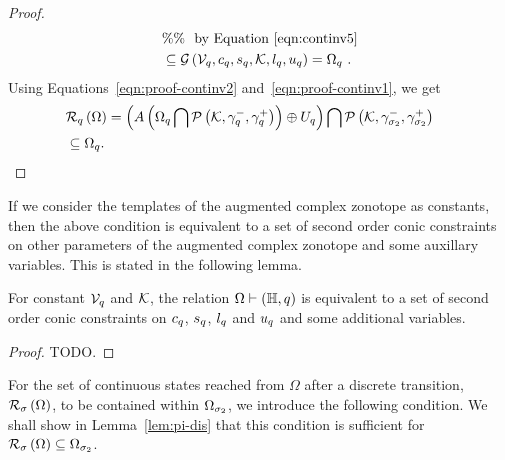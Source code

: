 \begin{proof}
\begin{align}
& \%\%~~\text{by Equation~\ref{eqn:continv5}}\nonumber\\
& \subseteq \mathcal{G}\left(\mathcal{V}_q,c_q,s_q,\mathcal{K},l_q,u_q\right)=\Omega_q~\label{eqn:proof-continv2}.
\end{align}
%
Using Equations~\ref{eqn:proof-continv2} and~\ref{eqn:proof-continv1},
we get
\begin{align*}
& \contreach{\loc}{\Omega}=\lt(\minsum{A\lt(\Omega_q\bigcap{\ptope{\qtemp}{\lsys{\stay_\loc}}{\usys{\stay_\loc}}}\rt)}{\inputset_\loc}\rt)\bigcap
\ptope{\qtemp}{\lsys{\stay_{\edge_2}}}{\usys{\stay_{\edge_2}}}\\
& \subseteq \Omega_\loc.\hspace{25em}\qedhere
\end{align*}
%
\end{proof}
%
If we consider the templates of the augmented complex zonotope as
constants, then the above condition is equivalent to a set of second
order conic constraints on other parameters of the augmented complex
zonotope and some auxillary variables.  This is stated in the
following lemma.
%
\begin{lemma}
For constant $\mathcal{V}_{q}$ and $\mathcal{K}$, the relation
$\Omega\vdash\left(\mathbb{H},q\right)$ is equivalent to a set of second order conic
constraints on $c_q$, $s_q$, $l_q$ and $u_q$
and some additional variables.
\end{lemma}
%
\begin{proof}
{\color{red} TODO}.
\end{proof}
%
For the set of continuous states reached from $\Omega$ after a
discrete transition, $\mathcal{R}_{\sigma}\left(\Omega\right)$, to be contained
within 
$\Omega_{\sigma_2}$, we introduce the following condition.  We shall
show in Lemma~\ref{lem:pi-dis} that this condition is sufficient for
$\mathcal{R}_{\sigma}\left(\Omega\right)\subseteq\Omega_{\sigma_2}$.
%
